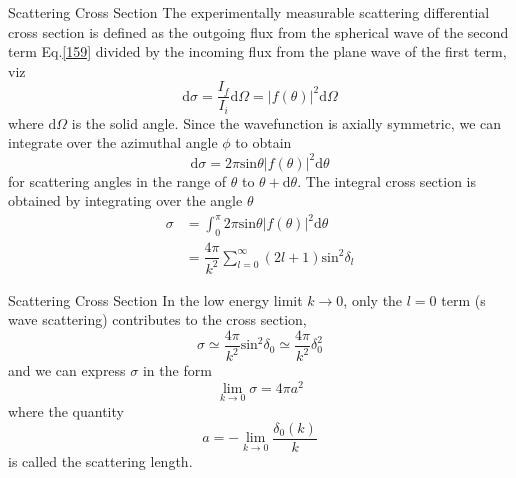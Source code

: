 \documentclass{beamer}
\begin{document}
	\begin{frame}{Scattering Cross Section}
		The experimentally measurable scattering differential cross section is defined as the outgoing flux from the spherical wave of the second term Eq.\eqref{159} divided by the incoming flux from the plane wave of the first term, viz
		\begin{equation}
			\mathrm{d}\sigma=\dfrac{I_f}{I_i}\mathrm{d}\Omega=|f(\theta)|^2\mathrm{d}\Omega
		\end{equation}
		where $\mathrm{d}\Omega$ is the solid angle. Since the wavefunction is axially symmetric, we can integrate over the azimuthal angle $\phi$ to obtain
		\begin{equation}
			\mathrm{d}\sigma=2\pi\mathrm{sin}\theta|f(\theta)|^2\mathrm{d}\theta
		\end{equation}
		for scattering angles in the range of $\theta$ to $\theta+\mathrm{d}\theta$. The integral cross section is obtained by integrating over the angle $\theta$
		\begin{align}
			\sigma&=\int_0^\pi2\pi\mathrm{sin}\theta|f(\theta)|^2\mathrm{d}\theta\nonumber\\
			&=\dfrac{4\pi}{k^2}\sum\limits_{l=0}^\infty(2l+1)\mathrm{sin}^2\delta_l
		\end{align}
	\end{frame}
	\begin{frame}{Scattering Cross Section}
		In the low energy limit $k\rightarrow0$, only the $l=0$ term (s wave scattering) contributes to the cross section,
		\begin{equation}
			\sigma\simeq\dfrac{4\pi}{k^2}\mathrm{sin}^2\delta_0\simeq\dfrac{4\pi}{k^2}\delta_0^2
		\end{equation}
		and we can express $\sigma$ in the form
		\begin{equation}
			\lim\limits_{k\rightarrow0}\sigma=4\pi a^2
		\end{equation}
		where the quantity
		\begin{equation}
			a=-\lim\limits_{k\rightarrow0}\dfrac{\delta_0(k)}{k}
		\end{equation}
		is called the scattering length.
	\end{frame}
\end{document}
